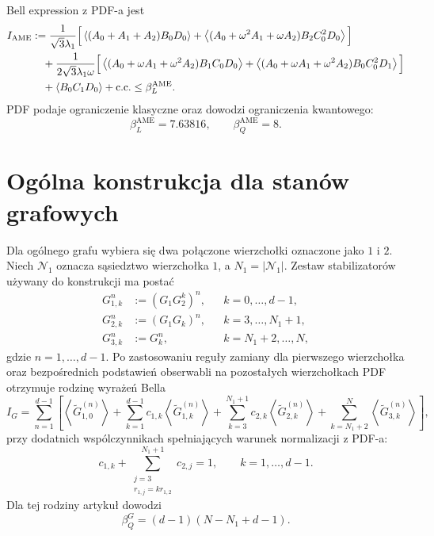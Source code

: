 \documentclass[12pt]{article}
\newcommand{\cc}{\mathrm{c.c.}}
\begin{document}
Bell expression z PDF-a jest
\begin{align}
    I_{\mathrm{AME}}
    &:=
    \frac{1}{\sqrt{3}\lambda_1}
    \Big[
        \left\langle (A_0+A_1+A_2)B_0D_0 \right\rangle
        +
        \left\langle (A_0+\omega^2A_1+\omega A_2)B_2C_0^2D_0 \right\rangle
    \Big] \notag\\
    &\quad+
    \frac{1}{2\sqrt{3}\lambda_1\omega}
    \Big[
        \left\langle (A_0+\omega A_1+\omega^2A_2)B_1C_0D_0 \right\rangle
        +
        \left\langle (A_0+\omega A_1+\omega^2A_2)B_0C_0^2D_1 \right\rangle
    \Big] \notag\\
    &\quad+
    \left\langle B_0C_1D_0\right\rangle+\cc
    \leq \beta_L^{\mathrm{AME}}.
\end{align}
PDF podaje ograniczenie klasyczne oraz dowodzi ograniczenia kwantowego:
\begin{equation}
    \beta_L^{\mathrm{AME}}=7.63816,
    \qquad
    \beta_Q^{\mathrm{AME}}=8.
\end{equation}

\section{Og\'olna konstrukcja dla stan\'ow grafowych}

Dla og\'olnego grafu wybiera si\k{e} dwa po\l{}\k{a}czone wierzcho\l{}ki oznaczone jako $1$ i $2$.
Niech $\mathcal{N}_1$ oznacza s\k{a}siedztwo wierzcho\l{}ka $1$, a $N_1=|\mathcal{N}_1|$.
Zestaw stabilizator\'ow u\.zywany do konstrukcji ma posta\'c
\begin{align}
    G_{1,k}^n &:= (G_1G_2^k)^n,
    && k=0,\ldots,d-1,\\
    G_{2,k}^n &:= (G_1G_k)^n,
    && k=3,\ldots,N_1+1,\\
    G_{3,k}^n &:= G_k^n,
    && k=N_1+2,\ldots,N,
\end{align}
gdzie $n=1,\ldots,d-1$. Po zastosowaniu regu\l{}y zamiany dla pierwszego wierzcho\l{}ka oraz
bezpo\'srednich podstawie\'n obserwabli na pozosta\l{}ych wierzcho\l{}kach PDF otrzymuje rodzin\k{e}
wyra\.ze\'n Bella
\begin{equation}
    I_G =
    \sum_{n=1}^{d-1}
    \left[
        \left\langle \widetilde{G}^{(n)}_{1,0}\right\rangle
        +
        \sum_{k=1}^{d-1}c_{1,k}
        \left\langle \widetilde{G}^{(n)}_{1,k}\right\rangle
        +
        \sum_{k=3}^{N_1+1}c_{2,k}
        \left\langle \widetilde{G}^{(n)}_{2,k}\right\rangle
        +
        \sum_{k=N_1+2}^{N}
        \left\langle \widetilde{G}^{(n)}_{3,k}\right\rangle
    \right],
\end{equation}
przy dodatnich wsp\'olczynnikach spe\l{}niaj\k{a}cych warunek normalizacji z PDF-a:
\begin{equation}
    c_{1,k}
    +
    \sum_{\substack{j=3\\ r_{1,j}=kr_{1,2}}}^{N_1+1} c_{2,j}
    =
    1,
    \qquad k=1,\ldots,d-1.
\end{equation}
Dla tej rodziny artyku\l{} dowodzi
\begin{equation}
    \beta_Q^G=(d-1)(N-N_1+d-1).
\end{equation}
\end{document}
